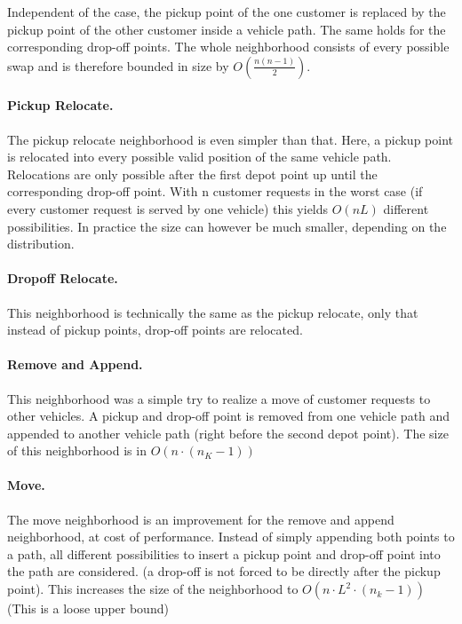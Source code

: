 \documentclass[12pt]{article}
\begin{document}
\bigskip

Independent of the case, the pickup point of the one customer is replaced by the pickup point of the other customer inside a vehicle path. The same holds for the corresponding drop-off points. The whole neighborhood consists of every possible swap and is therefore bounded in size by $O(\frac{n(n-1)}{2})$.

\paragraph{Pickup Relocate.}

The pickup relocate neighborhood is even simpler than that. Here, a pickup point is relocated into every possible valid position of the same vehicle path. Relocations are only possible after the first depot point up until the corresponding drop-off point. With n customer requests in the worst case (if every customer request is served by one vehicle) this yields $O(nL)$ different possibilities. In practice the size can however be much smaller, depending on the distribution.


\paragraph{Dropoff Relocate.}

This neighborhood is technically the same as the pickup relocate, only that instead of pickup points, drop-off points are relocated.

\paragraph{Remove and Append.}

This neighborhood was a simple try to realize a move of customer requests to other vehicles. A pickup and drop-off point is removed from one vehicle path and appended to another vehicle path (right before the second depot point). The size of this neighborhood is in $O(n \cdot (n_K - 1))$

\paragraph{Move.}

The move neighborhood is an improvement for the remove and append neighborhood, at cost of performance. Instead of simply appending both points to a path, all different possibilities to insert a pickup point and drop-off point into the path are considered. (a drop-off is not forced to be directly after the pickup point). This increases the size of the neighborhood to $O(n \cdot L^2 \cdot (n_k - 1))$ (This is a loose upper bound)
\end{document}
